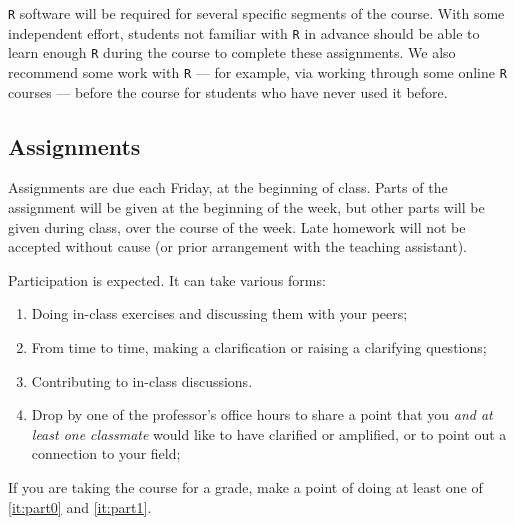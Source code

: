 \documentclass[12pt]{article}
\begin{document}
\begin{verse}   \end{verse}

\begin{verse}  \end{verse}

\texttt{R} software will be required for several specific segments of the course. With some independent effort, students not familiar with \texttt{R} in advance should be able to learn enough \texttt{R} during the course to complete these assignments. We also recommend some work with \texttt{R} --- for example, via working through some online \texttt{R} courses --- before the course for students who have never used it before.


\subsection*{Assignments}
Assignments are due each Friday, at the beginning of
class. Parts of the assignment will be given at the beginning of the week, but other parts will be given during class, over the course of the week.  Late homework will not be accepted without cause (or prior arrangement with the teaching assistant).

Participation is expected. It can take various forms:
\begin{enumerate}
\item Doing in-class exercises and discussing them with your peers;
\item From time to time, making a clarification or raising a clarifying questions;
\item \label{it:part0} Contributing to in-class discussions.
\item \label{it:part1} Drop by one of the professor's office hours to share a point that you \textit{and at least one classmate} would like to have clarified or amplified, or to point out a connection to your field;
\end{enumerate}
If you are taking the course for a grade, make a point of doing at
least one of \ref{it:part0} and \ref{it:part1}. %
\end{document}
